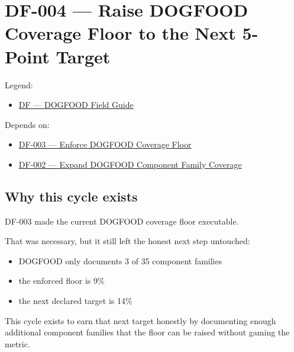 \chapter{DF-004 --- Raise DOGFOOD Coverage Floor to the Next 5-Point Target}\label{record-066}

\smallskip

Legend:

\begin{itemize}
\tightlist
\item
  \href{https://github.com/flyingrobots/bijou/blob/1853ad902f6bf219326409e7f743a5a1d6517dbc/docs/legends/DF-dogfood-field-guide.md}{DF --- DOGFOOD Field Guide}
\end{itemize}

Depends on:

\begin{itemize}
\tightlist
\item
  \href{https://github.com/flyingrobots/bijou/blob/cbd70612140e7a450d764b3c7be1c6af878b99bc/docs/design/DF-003-enforce-dogfood-coverage-floor.md}{DF-003 --- Enforce DOGFOOD Coverage Floor}
\item
  \href{https://github.com/flyingrobots/bijou/blob/cbd70612140e7a450d764b3c7be1c6af878b99bc/docs/method/graveyard/legacy-backlog/DF-002-expand-dogfood-component-family-coverage.md}{DF-002 --- Expand DOGFOOD Component Family Coverage}
\end{itemize}

\section{Why this cycle exists}\label{record-066-why-this-cycle-exists}

DF-003 made the current DOGFOOD coverage floor executable.

That was necessary, but it still left the honest next step untouched:

\begin{itemize}
\tightlist
\item
  DOGFOOD only documents 3 of 35 component families
\item
  the enforced floor is 9\%
\item
  the next declared target is 14\%
\end{itemize}

This cycle exists to earn that next target honestly by documenting enough additional component families that the floor can be raised without gaming the metric.

